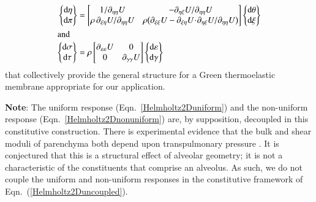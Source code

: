 \begin{subequations}
\label{Helmholtz2Duncoupled}
\begin{align}
\left\{ \begin{matrix}
\mathrm{d} \eta \\ \mathrm{d} \pi 
\end{matrix} \right\} & = \begin{bmatrix}
1 / \partial_{\eta\eta} U & 
-\partial_{\eta\xi} U / \partial_{\eta\eta} U \\ 
\rho \, \partial_{\xi\eta} U / \partial_{\eta\eta} U & 
\rho \bigl( \partial_{\xi\xi} U - \partial_{\xi\eta} U \!\cdot\! \partial_{\eta\xi} U / \partial_{\eta\eta} U \bigr)  
\end{bmatrix} 
\left\{ \begin{matrix}
\mathrm{d}\theta \\ \mathrm{d} \xi 
\end{matrix} \right\}
\label{Helmholtz2Duniform} \\
\intertext{and}
\left\{ \begin{matrix}
    \mathrm{d} \sigma \\ \mathrm{d} \tau
\end{matrix} \right\} & = \rho \begin{bmatrix}
    \partial_{\varepsilon\varepsilon} U & 0 \\
    0 & \partial_{\gamma\gamma} U 
\end{bmatrix} 
\left\{ \begin{matrix}
    \mathrm{d} \varepsilon \\ \mathrm{d} \gamma
\end{matrix} \right\}
\label{Helmholtz2Dnonuniform}
\end{align} 
\end{subequations}
that collectively provide the general structure for a Green thermo\-elastic membrane appropriate for our application.

\medskip\noindent
\textbf{Note}:  The uniform response (Eqn.~\ref{Helmholtz2Duniform}) and the non-uniform response (Eqn.~\ref{Helmholtz2Dnonuniform}) are, by supposition, decoupled in this constitutive construction.  There is experimental evidence that the bulk and shear moduli of parenchyma both depend upon transpulmonary pressure \cite{LaiFook79,Jahedetal90}.  It is conjectured that this is a structural effect of alveolar geometry; it is not a characteristic of the constituents that comprise an alveolus.  As such, we do not couple the uniform and non-uniform responses in the constitutive framework of Eqn.~(\ref{Helmholtz2Duncoupled}).

